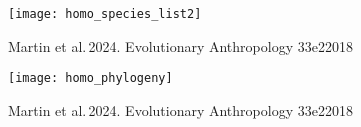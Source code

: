 \documentclass[t,handout]{beamer}  %
\newcommand{\futuyma}[1]{%
	\ifthenelse{\isempty{#1}}%
	{Futuyma \& Kirkpatrick 2017, 4th ed.}%
	{Fig.~#1~Futuyma \& Kirkpatrick 2017, 4th ed.}%
}
\begin{document}
\begin{frame}%

\texttt{[image: homo\_species\_list2]}

%
%


\tinyfill Martin et al.\,2024.  Evolutionary Anthropology 33e22018


\end{frame}


%
%
%


\begin{frame}

\centering


\texttt{[image: homo\_phylogeny]}

\tinyfill Martin et al.\,2024.  Evolutionary Anthropology 33e22018

\end{frame}
\end{document}
